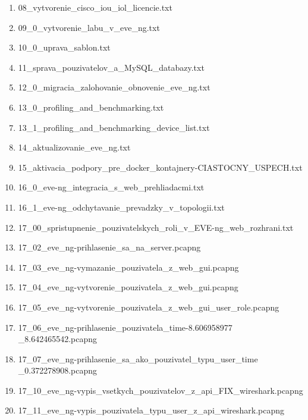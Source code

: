 \begin{enumerate}[noitemsep,label*=\thesection.\arabic*.]
\begin{enumerate}[noitemsep,label*=\arabic*.]
        \item \label{item:iou_licencia} 08\_vytvorenie\_cisco\_iou\_iol\_licencie.txt
        \item 09\_0\_vytvorenie\_labu\_v\_eve\_ng.txt
        \item \label{item:uprava_sablon} 10\_0\_uprava\_sablon.txt
        \item \label{item:sprava_pouzivatelov_a_databazy} 11\_sprava\_pouzivatelov\_a\_MySQL\_databazy.txt
        \item \label{item:obnova_zalohovanie} 12\_0\_migracia\_zalohovanie\_obnovenie\_eve\_ng.txt
        \item \label{item:benchmarking_popis} 13\_0\_profiling\_and\_benchmarking.txt
        \item \label{item:benchmarking_list} 13\_1\_profiling\_and\_benchmarking\_device\_list.txt
        \item \label{item:aktualizacia_eve_ng} 14\_aktualizovanie\_eve\_ng.txt
        \item 15\_aktivacia\_podpory\_pre\_docker\_kontajnery-CIASTOCNY\_USPECH.txt
        \item \label{item:integracia_s_prehliadacmi} 16\_0\_eve-ng\_integracia\_s\_web\_prehliadacmi.txt
        \item 16\_1\_eve-ng\_odchytavanie\_prevadzky\_v\_topologii.txt
        \item \label{item:spristupnenie_pouzivatelskych_roli} 17\_00\_spristupnenie\_pouzivatelskych\_roli\_v\_EVE-ng\_web\_rozhrani.txt
        \item 17\_02\_eve\_ng-prihlasenie\_sa\_na\_server.pcapng
        \item 17\_03\_eve\_ng-vymazanie\_pouzivatela\_z\_web\_gui.pcapng
        \item 17\_04\_eve\_ng-vytvorenie\_pouzivatela\_z\_web\_gui.pcapng
        \item 17\_05\_eve\_ng-vytvorenie\_pouzivatela\_z\_web\_gui\_user\_role.pcapng
        \item 17\_06\_eve\_ng-prihlasenie\_pouzivatela\_time-8.606958977\\\_8.642465542.pcapng
        \item 17\_07\_eve\_ng-prihlasenie\_sa\_ako\_pouzivatel\_typu\_user\_time\\\_0.372278908.pcapng
        \item 17\_10\_eve\_ng-vypis\_vsetkych\_pouzivatelov\_z\_api\_FIX\_wireshark.pcapng
        \item \label{item:spristupnenie_pouzivatelskych_roli_pcap_posledny} 17\_11\_eve\_ng-vypis\_pouzivatela\_typu\_user\_z\_api\_wireshark.pcapng

\end{enumerate}
\end{enumerate}
